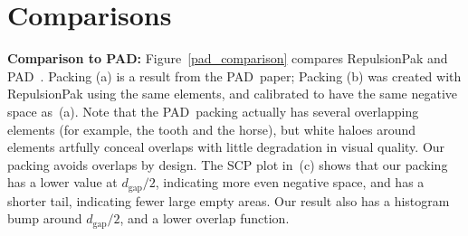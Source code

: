 \section{Comparisons}




\textbf{Comparison to PAD:} 
Figure~\ref{pad_comparison} compares
RepulsionPak and PAD~\cite{Kwan2016}.  Packing (a) is
a result from the PAD\ paper; Packing (b) was created with RepulsionPak using
the same elements, and calibrated to have the same negative space as~(a).
Note that the PAD\ packing actually has several overlapping elements
(for example, the tooth and the horse), but white haloes around
elements artfully conceal overlaps with little degradation in
visual quality.  Our packing avoids overlaps by design.
The SCP plot in~(c) shows that our packing has a lower value at $d_\mathrm{gap}/2$,
indicating more even negative space, and has a shorter tail,
indicating fewer large empty areas.
Our result also has a histogram bump around $d_\mathrm{gap}/2$, and 
a lower overlap function.

